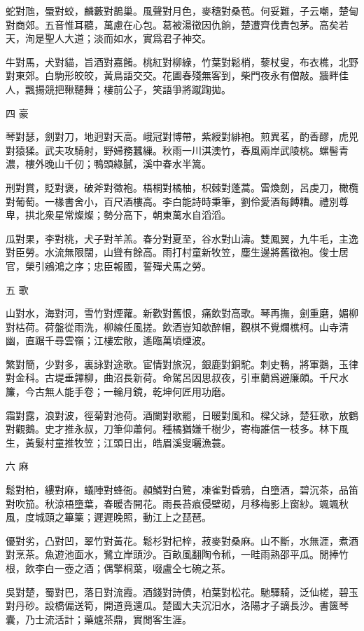 \documentclass[12pt,a4paper]{ctexbook}
\begin{document}
蛇對虺，蜃對蛟，麟藪對鵲巢。風聲對月色，麥穗對桑苞。何妥難，子云嘲，楚甸對商郊。五音惟耳聽，萬慮在心包。葛被湯徵因仇餉，楚遭齊伐責包茅。高矣若天，洵是聖人大道；淡而如水，實爲君子神交。\par
牛對馬，犬對貓，旨酒對嘉餚。桃紅對柳綠，竹葉對鬆梢，藜杖叟，布衣樵，北野對東郊。白駒形皎皎，黃鳥語交交。花圃春殘無客到，柴門夜永有僧敲。牆畔佳人，飄揚競把鞦韆舞；樓前公子，笑語爭將蹴踘拋。\par
四 豪\par
琴對瑟，劍對刀，地迥對天高。峨冠對博帶，紫綬對緋袍。煎異茗，酌香醪，虎兕對猿猱。武夫攻騎射，野婦務蠶繅。秋雨一川淇澳竹，春風兩岸武陵桃。螺髻青濃，樓外晚山千仞；鴨頭綠膩，溪中春水半篙。\par
刑對賞，貶對褒，破斧對徵袍。梧桐對橘柚，枳棘對蓬蒿。雷煥劍，呂虔刀，橄欖對葡萄。一椽書舍小，百尺酒樓高。李白能詩時秉筆，劉伶愛酒每餺糟。禮別尊卑，拱北衆星常燦燦；勢分高下，朝東萬水自滔滔。\par
瓜對果，李對桃，犬子對羊羔。春分對夏至，谷水對山濤。雙鳳翼，九牛毛，主逸對臣勞。水流無限闊，山聳有餘高。雨打村童新牧笠，塵生邊將舊徵袍。俊士居官，榮引鵷鴻之序；忠臣報國，誓殫犬馬之勞。\par
五 歌\par
山對水，海對河，雪竹對煙蘿。新歡對舊恨，痛飲對高歌。琴再撫，劍重磨，媚柳對枯荷。荷盤從雨洗，柳線任風搓。飲酒豈知欹醉帽，觀棋不覺爛樵柯。山寺清幽，直踞千尋雲嶺；江樓宏敞，遙臨萬頃煙波。\par
繁對簡，少對多，裏詠對途歌。宦情對旅況，銀鹿對銅駝。刺史鴨，將軍鵝，玉律對金科。古堤垂嚲柳，曲沼長新荷。命駕呂因思叔夜，引車藺爲避廉頗。千尺水簾，今古無人能手卷；一輪月鏡，乾坤何匠用功磨。\par
霜對露，浪對波，徑菊對池荷。酒闌對歌罷，日暖對風和。樑父詠，楚狂歌，放鶴對觀鵝。史才推永叔，刀筆仰蕭何。種橘猶嫌千樹少，寄梅誰信一枝多。林下風生，黃髮村童推牧笠；江頭日出，皓眉溪叟曬漁蓑。\par
六 麻\par
鬆對柏，縷對麻，蟻陣對蜂衙。頳鱗對白鷺，凍雀對昏鴉，白墮酒，碧沉茶，品笛對吹笳。秋涼梧墮葉，春暖杏開花。雨長苔痕侵壁砌，月移梅影上窗紗。颯颯秋風，度城頭之篳篥；遲遲晚照，動江上之琵琶。\par
優對劣，凸對凹，翠竹對黃花。鬆杉對杞梓，菽麥對桑麻。山不斷，水無涯，煮酒對烹茶。魚遊池面水，鷺立岸頭沙。百畝風翻陶令秫，一畦雨熟邵平瓜。閒捧竹根，飲李白一壺之酒；偶擎桐葉，啜盧仝七碗之茶。\par
吳對楚，蜀對巴，落日對流霞。酒錢對詩債，柏葉對松花。馳驛騎，泛仙槎，碧玉對丹砂。設橋偏送筍，開道竟還瓜。楚國大夫沉汨水，洛陽才子謫長沙。書篋琴囊，乃士流活計；藥爐茶鼎，實閒客生涯。\par
\end{document}
